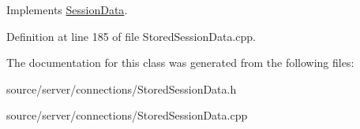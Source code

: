 Implements \hyperlink{class_session_data_ad05a594d8410d638f1a066bfa5a10ba3}{Session\-Data}.



Definition at line 185 of file Stored\-Session\-Data.\-cpp.



The documentation for this class was generated from the following files\-:\begin{DoxyCompactItemize}
\item 
source/server/connections/Stored\-Session\-Data.\-h\item 
source/server/connections/Stored\-Session\-Data.\-cpp\end{DoxyCompactItemize}
